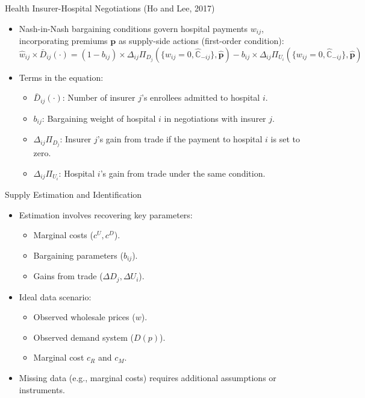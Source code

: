 \documentclass[aspectratio=169]{beamer}  %
\begin{document}
\begin{frame}{Health Insurer-Hospital Negotiations (Ho and Lee, 2017)}
    \begin{itemize}
        \item Nash-in-Nash bargaining conditions govern hospital payments \(w_{ij}\), incorporating premiums \(\boldsymbol{p}\) as supply-side actions (first-order condition):
        \[
        \widehat{w}_{ij} \times \bar{D}_{ij}(\cdot) = 
        \left(1 - b_{ij}\right) \times \Delta_{ij} \Pi_{D_j}\left(\{w_{ij} = 0, \widehat{\mathbb{C}}_{-ij}\}, \widehat{\boldsymbol{p}}\right)
        - b_{ij} \times \Delta_{ij} \Pi_{U_i}\left(\{w_{ij} = 0, \widehat{\mathbb{C}}_{-ij}\}, \widehat{\boldsymbol{p}}\right)
        \]
        \item Terms in the equation:
        \begin{itemize}
            \item \(\bar{D}_{ij}(\cdot)\): Number of insurer \(j\)'s enrollees admitted to hospital \(i\).
            \item \(b_{ij}\): Bargaining weight of hospital \(i\) in negotiations with insurer \(j\).
            \item \(\Delta_{ij} \Pi_{D_j}\): Insurer \(j\)'s gain from trade if the payment to hospital \(i\) is set to zero.
            \item \(\Delta_{ij} \Pi_{U_i}\): Hospital \(i\)'s gain from trade under the same condition.
        \end{itemize}
    \end{itemize}
\end{frame}


\begin{frame}{Supply Estimation and Identification}
    \begin{itemize}
        \item Estimation involves recovering key parameters:
        \begin{itemize}
            \item Marginal costs (\(c^U, c^D\)).
            \item Bargaining parameters (\(b_{ij}\)).
            \item Gains from trade (\(\Delta D_j, \Delta U_i\)).
        \end{itemize}
        \item Ideal data scenario:
        \begin{itemize}
            \item Observed wholesale prices (\(w\)).
            \item Observed demand system (\(D(p)\)).
            \item Marginal cost $c_R$ and $c_M$.
        \end{itemize}
        \item Missing data (e.g., marginal costs) requires additional assumptions or instruments.
    \end{itemize}
\end{frame}
\end{document}
